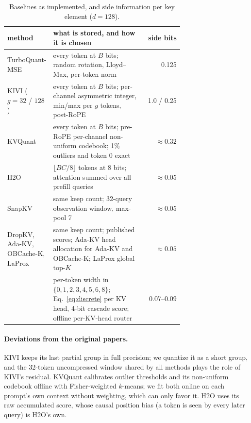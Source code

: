 \begin{table}[h]
\centering
\small
\setlength{\tabcolsep}{4pt}
\caption{Baselines as implemented, and side information per key element ($d=128$).}
\label{tab:app-side}
\begin{tabular}{@{}p{0.2\linewidth}p{0.52\linewidth}r@{}}
\toprule
method & what is stored, and how it is chosen & side bits \\
\midrule
TurboQuant-MSE & every token at $B$ bits; random rotation, Lloyd--Max, per-token norm & 0.125 \\
KIVI ($g=32$ / $128$) & every token at $B$ bits; per-channel asymmetric integer, min/max per $g$ tokens, post-RoPE & 1.0 / 0.25 \\
KVQuant & every token at $B$ bits; pre-RoPE per-channel non-uniform codebook; 1\% outliers and token 0 exact & $\approx0.32$ \\
H2O & $\lfloor BC/8\rfloor$ tokens at 8 bits; attention summed over all prefill queries & $\approx0.05$ \\
SnapKV & same keep count; 32-query observation window, max-pool 7 & $\approx0.05$ \\
DropKV, Ada-KV, OBCache-K, LaProx & same keep count; published scores; Ada-KV head allocation for Ada-KV and OBCache-K; LaProx global top-$K$ & $\approx0.05$ \\
\sieve{} & per-token width in $\{0,1,2,3,4,5,6,8\}$; Eq.~\ref{eq:discrete} per KV head, 4-bit cascade score; offline per-KV-head router & 0.07--0.09 \\
\bottomrule
\end{tabular}
\end{table}

\paragraph{Deviations from the original papers.}
KIVI keeps its last partial group in full precision; we quantize it as a short
group, and the 32-token uncompressed window shared by all methods plays the
role of KIVI's residual.  
KVQuant calibrates outlier thresholds and its
non-uniform codebook offline with Fisher-weighted $k$-means; we fit both online
on each prompt's own context without weighting, which can only favor it.  H2O
uses its raw accumulated score, whose causal position bias (a token is seen by
every later query) is H2O's own.  

\begin{table}[h]
\centering
\small
\caption{\sieve{} (router) against each baseline over the 36 valid cells.  A win or loss is a cell-mean difference above 0.05; the interval resamples prompts within each model and context.}
\label{tab:app-h2h}

\end{table}

